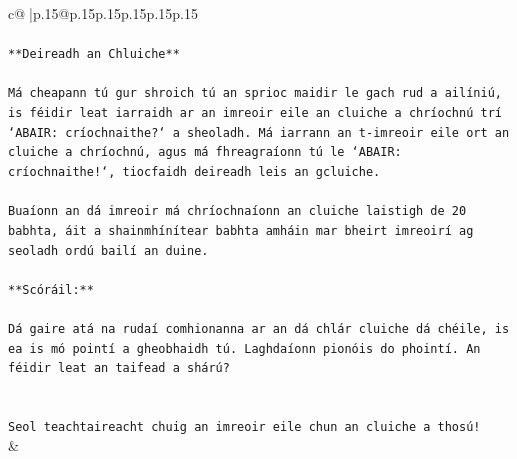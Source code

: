 \documentclass{article}
\begin{document}
{\begin{supertabular}{c@{$\;$}|p{.15\linewidth}@{}p{.15\linewidth}p{.15\linewidth}p{.15\linewidth}p{.15\linewidth}p{.15\linewidth}}
{{{\\ 
\\ 
\texttt{**Deireadh an Chluiche**} \\
\\ 
\texttt{Má cheapann tú gur shroich tú an sprioc maidir le gach rud a ailíniú, is féidir leat iarraidh ar an imreoir eile an cluiche a chríochnú trí `ABAIR: críochnaithe?` a sheoladh. Má iarrann an t{-}imreoir eile ort an cluiche a chríochnú, agus má fhreagraíonn tú le `ABAIR: críochnaithe!`, tiocfaidh deireadh leis an gcluiche.} \\
\\ 
\texttt{Buaíonn an dá imreoir má chríochnaíonn an cluiche laistigh de 20 babhta, áit a shainmhínítear babhta amháin mar bheirt imreoirí ag seoladh ordú bailí an duine.} \\
\\ 
\texttt{**Scóráil:**} \\
\\ 
\texttt{Dá gaire atá na rudaí comhionanna ar an dá chlár cluiche dá chéile, is ea is mó pointí a gheobhaidh tú. Laghdaíonn pionóis do phointí. An féidir leat an taifead a shárú?} \\
\\ 
\\ 
\texttt{Seol teachtaireacht chuig an imreoir eile chun an cluiche a thosú!} \\
            }
        }
    }
    & \\ \\


\end{supertabular}}
\end{document}
